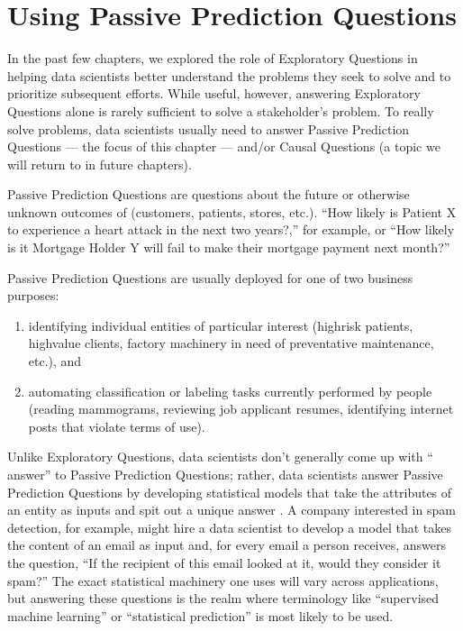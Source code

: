 \documentclass[letterpaper,10pt,english]{jupyterBook}
\begin{document}
\chapter{Using Passive Prediction Questions}
\label{\detokenize{30_questions/20_using_passive_prediction_questions:using-passive-prediction-questions}}\label{\detokenize{30_questions/20_using_passive_prediction_questions::doc}}
\sphinxAtStartPar
In the past few chapters, we explored the role of Exploratory Questions in helping data scientists better understand the problems they seek to solve and to prioritize subsequent efforts. While useful, however, answering Exploratory Questions alone is rarely sufficient to solve a stakeholder’s problem. To really solve problems, data scientists usually need to answer Passive Prediction Questions — the focus of this chapter — and/or Causal Questions (a topic we will return to in future chapters).

\sphinxAtStartPar
Passive Prediction Questions are questions about the future or otherwise unknown outcomes of  (customers, patients, stores, etc.). “How likely is Patient X to experience a heart attack in the next two years?,” for example, or “How likely is it Mortgage Holder Y will fail to make their mortgage payment next month?”

\sphinxAtStartPar
Passive Prediction Questions are usually deployed for one of two business purposes:
\begin{enumerate}
%
\item {} 
\sphinxAtStartPar
identifying individual entities of particular interest (high\sphinxhyphen{}risk patients, high\sphinxhyphen{}value clients, factory machinery in need of preventative maintenance, etc.), and

\item {} 
\sphinxAtStartPar
automating classification or labeling tasks currently performed by people (reading mammograms, reviewing job applicant resumes, identifying internet posts that violate terms of use).

\end{enumerate}

\sphinxAtStartPar
Unlike Exploratory Questions, data scientists don’t generally come up with “ answer” to Passive Prediction Questions; rather, data scientists answer Passive Prediction Questions by developing statistical models that take the attributes of an entity as inputs and spit out a unique answer . A company interested in spam detection, for example, might hire a data scientist to develop a model that takes the content of an email as input and, for every email a person receives, answers the question, “If the recipient of this email looked at it, would they consider it spam?” The exact statistical machinery one uses will vary across applications, but answering these questions is the realm where terminology like “supervised machine learning” or “statistical prediction” is most likely to be used.
\end{document}
